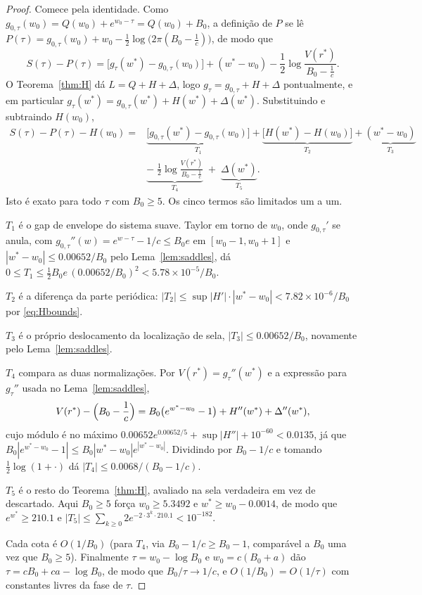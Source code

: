 \documentclass[11pt]{amsart}
\theoremstyle{plain}
\theoremstyle{definition}
\theoremstyle{remark}
\begin{document}
\begin{proof}
Comece pela identidade. Como $g_{0,\tau}(w_0) = Q(w_0)+e^{w_0-\tau} = Q(w_0)+B_0$, a definição de
$P$ se lê $P(\tau) = g_{0,\tau}(w_0)+w_0-\tfrac12\log\bigl(2\pi(B_0-\tfrac1c)\bigr)$, de modo que
\[
S(\tau)-P(\tau) = \bigl[g_\tau(w^*)-g_{0,\tau}(w_0)\bigr]+(w^*-w_0)
-\frac12\log\frac{V(r^*)}{B_0-\tfrac1c}.
\]
O Teorema~\ref{thm:H} dá $L = Q+H+\Delta$, logo $g_\tau = g_{0,\tau}+H+\Delta$ pontualmente, e em
particular $g_\tau(w^*) = g_{0,\tau}(w^*)+H(w^*)+\Delta(w^*)$. Substituindo e subtraindo $H(w_0)$,
\begin{equation}
\label{eq:envfive}
\begin{split}
S(\tau)-P(\tau)-H(w_0) = {}& \underbrace{\bigl[g_{0,\tau}(w^*)-g_{0,\tau}(w_0)\bigr]}_{T_1}
+\underbrace{\bigl[H(w^*)-H(w_0)\bigr]}_{T_2}
+\underbrace{(w^*-w_0)}_{T_3} \\[2pt]
&{}\underbrace{-\;\frac12\log\frac{V(r^*)}{B_0-\tfrac1c}}_{T_4}
\;+\;\underbrace{\Delta(w^*)}_{T_5}.
\end{split}
\end{equation}
Isto é exato para todo $\tau$ com $B_0\ge5$. Os cinco termos são limitados um a um.

$T_1$ é o gap de envelope do sistema suave. Taylor em torno de $w_0$, onde $g_{0,\tau}'$ se anula,
com $g_{0,\tau}''(w) = e^{w-\tau}-1/c \le B_0e$ em $[w_0-1,w_0+1]$ e $|w^*-w_0| \le 0.00652/B_0$
pelo Lema~\ref{lem:saddles}, dá $0\le T_1 \le \tfrac12 B_0e\,(0.00652/B_0)^2 < 5.78\times10^{-5}/B_0$.

$T_2$ é a diferença da parte periódica: $|T_2| \le \sup|H'|\cdot|w^*-w_0| < 7.82\times10^{-6}/B_0$
por \eqref{eq:Hbounds}.

$T_3$ é o próprio deslocamento da localização de sela, $|T_3| \le 0.00652/B_0$, novamente pelo
Lema~\ref{lem:saddles}.

$T_4$ compara as duas normalizações. Por $V(r^*) = g_\tau''(w^*)$ e a expressão para $g_\tau''$
usada no Lema~\ref{lem:saddles},
\[
V(r^*)-\Bigl(B_0-\frac1c\Bigr) = B_0\bigl(e^{w^*-w_0}-1\bigr)+H''(w^*)+\Delta''(w^*),
\]
cujo módulo é no máximo $0.00652e^{0.00652/5}+\sup|H''|+10^{-60} < 0.0135$, já que
$B_0|e^{w^*-w_0}-1| \le B_0|w^*-w_0|e^{|w^*-w_0|}$. Dividindo por $B_0-1/c$ e tomando
$\tfrac12\log(1+\cdot)$ dá $|T_4| \le 0.0068/(B_0-1/c)$.

$T_5$ é o resto do Teorema~\ref{thm:H}, avaliado na sela verdadeira em vez de descartado. Aqui
$B_0\ge5$ força $w_0\ge5.3492$ e $w^*\ge w_0-0.0014$, de modo que $e^{w^*}\ge210.1$ e
$|T_5| \le \sum_{k\ge0}2e^{-2\cdot3^k\cdot210.1} < 10^{-182}$.

Cada cota é $O(1/B_0)$ (para $T_4$, via $B_0-1/c\ge B_0-1$, comparável a $B_0$ uma vez que
$B_0\ge5$). Finalmente $\tau = w_0-\log B_0$ e $w_0 = c(B_0+a)$ dão $\tau = cB_0+ca-\log B_0$, de
modo que $B_0/\tau \to 1/c$, e $O(1/B_0) = O(1/\tau)$ com constantes livres da fase de $\tau$.
\end{proof}
\end{document}
